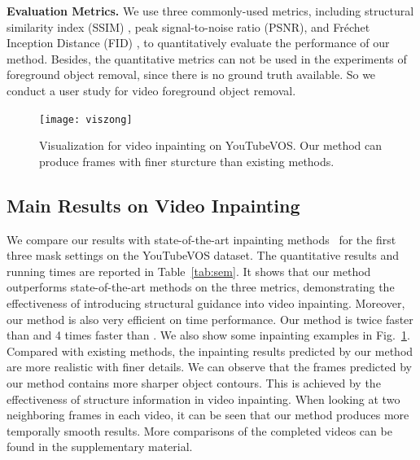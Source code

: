 \noindent \textbf{Evaluation Metrics.} 
We use three commonly-used metrics, including structural similarity index (SSIM) \cite{wang2004image}, peak signal-to-noise ratio (PSNR), and Fr{\'e}chet Inception Distance (FID) \cite{heusel2017gans}, to quantitatively evaluate the performance of our method. 
%
Besides, the quantitative metrics can not be used in the experiments of foreground object removal, since there is no ground truth available. 
So we conduct a user study for video foreground object removal. 
 



\begin{figure}[t]
	\centering
	\texttt{[image: viszong]} %
	\caption{Visualization for video inpainting on YouTubeVOS. Our method can produce frames with finer sturcture than existing methods. }
	\label{viszong}
\end{figure}


\subsection{Main Results on Video Inpainting}

We compare our results with state-of-the-art inpainting methods~\cite{nazeri2019edgeconnect,wang2019video,Kim_2019_CVPR1,Xu_2019_CVPR} for the first three mask settings on the YouTubeVOS dataset. 
%
The quantitative results and running times are reported in Table~\ref{tab:sem}.
It shows that our method outperforms state-of-the-art methods on the three metrics, demonstrating the effectiveness of introducing structural guidance into video inpainting.
Moreover, our method is also very efficient on time performance. 
Our method is twice faster than \cite{Kim_2019_CVPR1} and 4 times faster than \cite{Xu_2019_CVPR}. 
%
We also show some inpainting examples in Fig.~\ref{viszong}.
Compared with existing methods, the inpainting results predicted by our method are more realistic with finer details. 
We can observe that the frames predicted by our method contains more sharper object contours. This is achieved by the effectiveness of structure information in video inpainting.
%
When looking at two neighboring frames in each video, it can be seen that our method produces more temporally smooth results. More comparisons of the completed videos can be found in the supplementary material.




